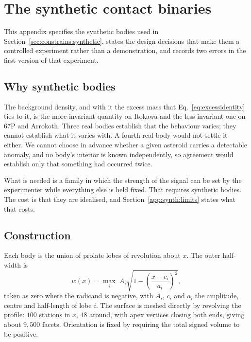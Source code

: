 \section{The synthetic contact binaries}
\label{app:synth}

This appendix specifies the synthetic bodies used in
Section~\ref{sec:constrains:synthetic}, states the design decisions that make
them a controlled experiment rather than a demonstration, and records two
errors in the first version of that experiment.

\subsection{Why synthetic bodies}
\label{app:synth:why}

The background density, and with it the excess mass that
Eq.~\eqref{eq:excessidentity} ties to it, is the more invariant quantity on
Itokawa and the less invariant one on 67P and Arrokoth. Three real bodies establish that the
behaviour varies; they cannot establish what it varies with. A fourth real body
would not settle it either. We cannot choose in advance whether a given
asteroid carries a detectable anomaly, and no body's interior is known
independently, so agreement would establish only that something had occurred
twice.

What is needed is a family in which the strength of the signal can be set by
the experimenter while everything else is held fixed. That requires synthetic
bodies. The cost is that they are idealised, and Section~\ref{app:synth:limits}
states what that costs.

\subsection{Construction}
\label{app:synth:build}

Each body is the union of prolate lobes of revolution about $x$. The outer
half-width is
\begin{equation}
w(x) = \max_{i}\; A_i \sqrt{1 - \left(\frac{x - c_i}{a_i}\right)^{2}},
\label{eq:appsynthprofile}
\end{equation}
taken as zero where the radicand is negative, with $A_i$, $c_i$ and $a_i$ the
amplitude, centre and half-length of lobe $i$. The surface is meshed directly
by revolving the profile: $100$ stations in $x$, $48$ around, with apex
vertices closing both ends, giving about $9{,}500$ facets. Orientation is fixed
by requiring the total signed volume to be positive.

